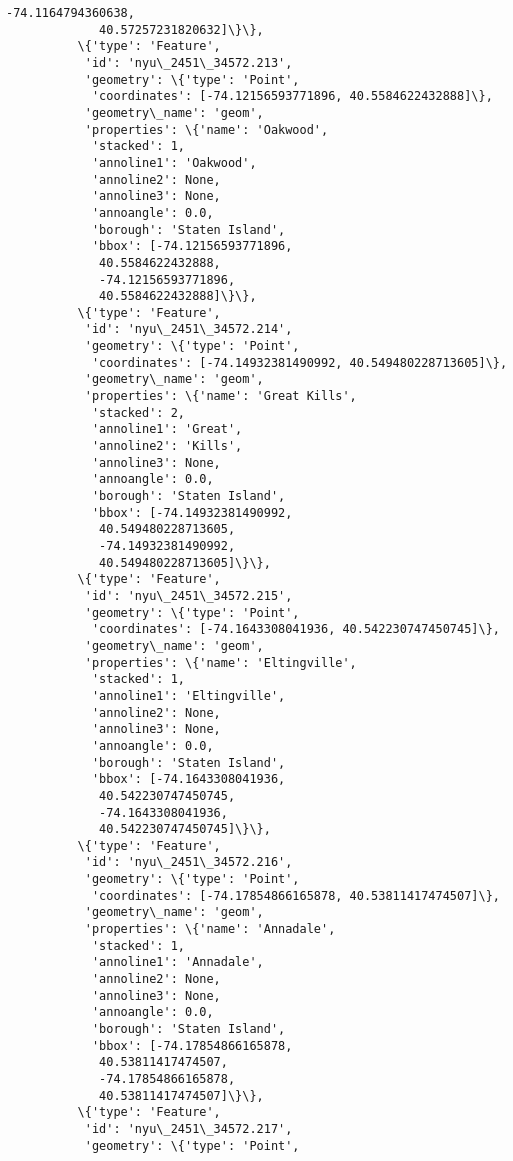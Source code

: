 \documentclass[11pt]{article}
\begin{document}
\begin{Verbatim}[commandchars=\\\{\}]
             -74.1164794360638,
             40.57257231820632]\}\},
          \{'type': 'Feature',
           'id': 'nyu\_2451\_34572.213',
           'geometry': \{'type': 'Point',
            'coordinates': [-74.12156593771896, 40.5584622432888]\},
           'geometry\_name': 'geom',
           'properties': \{'name': 'Oakwood',
            'stacked': 1,
            'annoline1': 'Oakwood',
            'annoline2': None,
            'annoline3': None,
            'annoangle': 0.0,
            'borough': 'Staten Island',
            'bbox': [-74.12156593771896,
             40.5584622432888,
             -74.12156593771896,
             40.5584622432888]\}\},
          \{'type': 'Feature',
           'id': 'nyu\_2451\_34572.214',
           'geometry': \{'type': 'Point',
            'coordinates': [-74.14932381490992, 40.549480228713605]\},
           'geometry\_name': 'geom',
           'properties': \{'name': 'Great Kills',
            'stacked': 2,
            'annoline1': 'Great',
            'annoline2': 'Kills',
            'annoline3': None,
            'annoangle': 0.0,
            'borough': 'Staten Island',
            'bbox': [-74.14932381490992,
             40.549480228713605,
             -74.14932381490992,
             40.549480228713605]\}\},
          \{'type': 'Feature',
           'id': 'nyu\_2451\_34572.215',
           'geometry': \{'type': 'Point',
            'coordinates': [-74.1643308041936, 40.542230747450745]\},
           'geometry\_name': 'geom',
           'properties': \{'name': 'Eltingville',
            'stacked': 1,
            'annoline1': 'Eltingville',
            'annoline2': None,
            'annoline3': None,
            'annoangle': 0.0,
            'borough': 'Staten Island',
            'bbox': [-74.1643308041936,
             40.542230747450745,
             -74.1643308041936,
             40.542230747450745]\}\},
          \{'type': 'Feature',
           'id': 'nyu\_2451\_34572.216',
           'geometry': \{'type': 'Point',
            'coordinates': [-74.17854866165878, 40.53811417474507]\},
           'geometry\_name': 'geom',
           'properties': \{'name': 'Annadale',
            'stacked': 1,
            'annoline1': 'Annadale',
            'annoline2': None,
            'annoline3': None,
            'annoangle': 0.0,
            'borough': 'Staten Island',
            'bbox': [-74.17854866165878,
             40.53811417474507,
             -74.17854866165878,
             40.53811417474507]\}\},
          \{'type': 'Feature',
           'id': 'nyu\_2451\_34572.217',
           'geometry': \{'type': 'Point',

\end{Verbatim}
\end{document}
